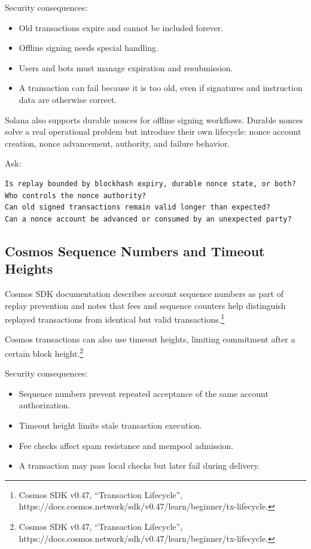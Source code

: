 Security consequences:

\begin{itemize}
\tightlist
\item
  Old transactions expire and cannot be included forever.
\item
  Offline signing needs special handling.
\item
  Users and bots must manage expiration and resubmission.
\item
  A transaction can fail because it is too old, even if signatures and
  instruction data are otherwise correct.
\end{itemize}

Solana also supports durable nonces for offline signing workflows.
Durable nonces solve a real operational problem but introduce their own
lifecycle: nonce account creation, nonce advancement, authority, and
failure behavior.

Ask:

\begin{lstlisting}
Is replay bounded by blockhash expiry, durable nonce state, or both?
Who controls the nonce authority?
Can old signed transactions remain valid longer than expected?
Can a nonce account be advanced or consumed by an unexpected party?
\end{lstlisting}

\subsection{Cosmos Sequence Numbers and Timeout Heights}

Cosmos SDK documentation describes account sequence numbers as part of
replay prevention and notes that fees and sequence counters help
distinguish replayed transactions from identical but valid
transactions.\footnote{Cosmos SDK v0.47, ``Transaction Lifecycle'',
  https://docs.cosmos.network/sdk/v0.47/learn/beginner/tx-lifecycle.}

Cosmos transactions can also use timeout heights, limiting commitment
after a certain block height.\footnote{Cosmos SDK v0.47, ``Transaction
  Lifecycle'',
  https://docs.cosmos.network/sdk/v0.47/learn/beginner/tx-lifecycle.}

Security consequences:

\begin{itemize}
\tightlist
\item
  Sequence numbers prevent repeated acceptance of the same account
  authorization.
\item
  Timeout height limits stale transaction execution.
\item
  Fee checks affect spam resistance and mempool admission.
\item
  A transaction may pass local checks but later fail during delivery.
\end{itemize}

